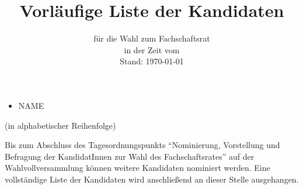 

\def\stand{\today}

\parindent 0pt
\parskip 10pt


\title{Vorläufige Liste der Kandidaten}
\subtitle{für die Wahl zum Fachschaftsrat \fach \\ in der Zeit vom \zeit\\Stand: \stand}
\date{}

\pagestyle{empty}
\thispagestyle{empty}
\renewcommand{\titlepagestyle}{empty}

\maketitle

\begin{center}
\Huge
\begin{itemize}
  \item NAME
\end{itemize}

\small
(in alphabetischer Reihenfolge)
\end{center}

Bis zum Abschluss des Tagesordnungspunkts ``Nominierung, Vorstellung und Befragung der KandidatInnen zur Wahl des Fachschaftsrates'' auf der Wahlvollversammlung können weitere Kandidaten nominiert werden. Eine vollständige Liste der Kandidaten wird anschließend an dieser Stelle ausgehangen.

